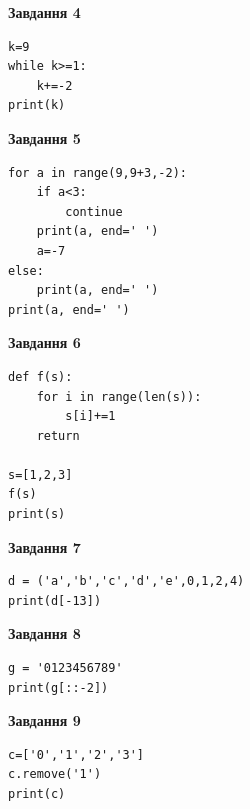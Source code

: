 \documentclass[12pt, ukrainian]{article}
\begin{document}
{{\begin{minipage}[t]{7.5cm}
\begin{center}
\textbf{Завдання 4}
\end{center}

\begin{verbatim}
k=9
while k>=1:
    k+=-2
print(k)
\end{verbatim}

\end{minipage}
\vline \hspace{6mm}
\begin{minipage}[t]{10.5cm}

\begin{center}
\textbf{Завдання 5}
\end{center}

\begin{verbatim}
for a in range(9,9+3,-2):
    if a<3:
        continue
    print(a, end=' ')
    a=-7
else:
    print(a, end=' ')
print(a, end=' ')
\end{verbatim}



\begin{center}
\textbf{Завдання 6}
\end{center}

\begin{verbatim}
def f(s):
    for i in range(len(s)):
        s[i]+=1
    return

s=[1,2,3]
f(s)
print(s)
\end{verbatim}



\begin{center}
\textbf{Завдання 7}
\end{center}

\begin{verbatim}
d = ('a','b','c','d','e',0,1,2,4)
print(d[-13])
\end{verbatim}



\begin{center}
\textbf{Завдання 8}
\end{center}

\begin{verbatim}
g = '0123456789'
print(g[::-2])
\end{verbatim}



\begin{center}
\textbf{Завдання 9}
\end{center}

\begin{verbatim}
c=['0','1','2','3']
c.remove('1')
print(c)
\end{verbatim}




\end{minipage}}}
\end{document}
